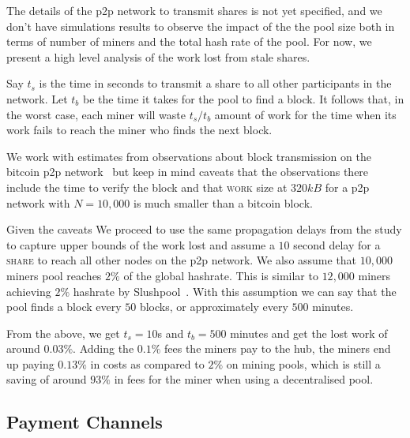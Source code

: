 \documentclass{article}
\begin{document}
The details of the p2p network to transmit shares is not yet
specified, and we don't have simulations results to observe the impact
of the the pool size both in terms of number of miners and the total
hash rate of the pool. For now, we present a high level analysis of
the work lost from stale shares.

Say $t_{s}$ is the time in seconds to transmit a share to all other
participants in the network.  Let $t_{b}$ be the time it takes for the
pool to find a block. It follows that, in the worst case, each miner
will waste $t_{s}/t_{b}$ amount of work for the time when its work
fails to reach the miner who finds the next block.

We work with estimates from observations about block transmission on
the bitcoin p2p network~\cite{information-propagation} but keep in
mind caveats that the observations there include the time to verify
the block and that \textsc{work} size at $320kB$ for a p2p network
with $N = 10,000$ is much smaller than a bitcoin block.

Given the caveats We proceed to use the same propagation delays from
the study to capture upper bounds of the work lost and assume a $10$
second delay for a \textsc{share} to reach all other nodes on the p2p
network. We also assume that $10,000$ miners pool reaches $2\%$ of the
global hashrate. This is similar to $12,000$ miners achieving $2\%$
hashrate by Slushpool~\cite{slushpool}. With this assumption we can
say that the pool finds a block every $50$ blocks, or approximately
every $500$ minutes.

From the above, we get $t_{s} = 10$s and $t_{b} = 500$ minutes and get
the lost work of around $0.03\%$. Adding the $0.1\%$ fees the miners
pay to the hub, the miners end up paying $0.13\%$ in costs as compared
to $2\%$ on mining pools, which is still a saving of around $93\%$ in
fees for the miner when using a decentralised pool.



\subsection{Payment Channels}\label{ref:channels}
\end{document}
